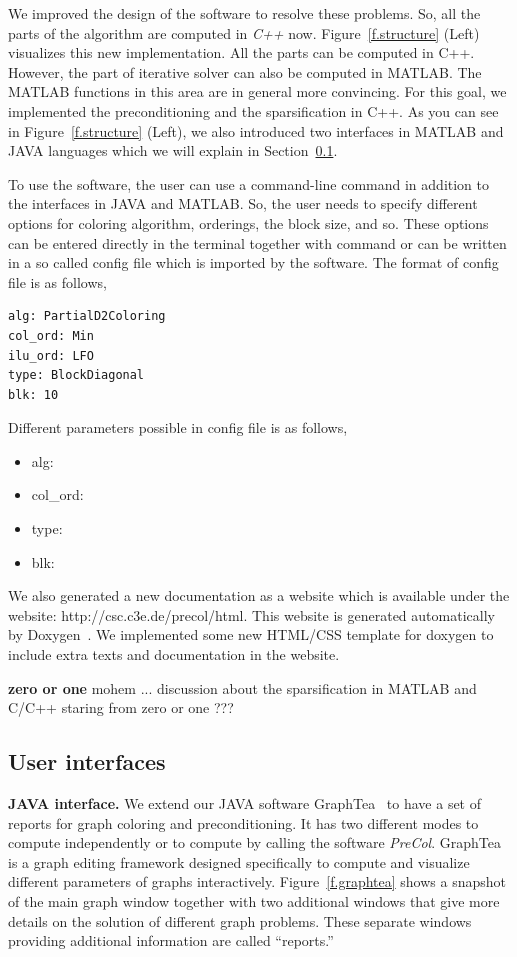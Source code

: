 \documentclass[11pt, twoside,a4paper]{book}
\newcommand{\todo}[1]{\textbf{#1}}
\begin{document}
We improved the design of the software to resolve these problems.
So, all the parts of the algorithm are computed in \textit{C++} now.
Figure~\ref{f.structure} (Left) visualizes this new implementation.
All the parts can be computed in C++. However,
the part of iterative solver can also be computed in MATLAB.
The MATLAB functions in this area are in general more convincing.
For this goal, we implemented the preconditioning and the sparsification in C++.
As you can see in Figure~\ref{f.structure} (Left), we also introduced
two interfaces in MATLAB and JAVA languages which we will explain in
Section~\ref{s.interfaces}.

To use the software, the user can use a command-line command in addition to
the interfaces in JAVA and MATLAB. So, the user needs to specify different
options for coloring algorithm, orderings, the block size, and so.
These options can be entered directly in the terminal together with command
or can be written in a so called config file which is imported by the software.
The format of config file is as follows,
\begin{lstlisting}
alg: PartialD2Coloring
col_ord: Min
ilu_ord: LFO
type: BlockDiagonal
blk: 10
\end{lstlisting}
Different parameters possible in config file is as follows,
\begin{itemize}
\item alg:
\item col\_ord:
\item type:
\item blk:
\end{itemize}

We also generated a new documentation as a website which is available
under the website: http://csc.c3e.de/precol/html.
This website is generated automatically by Doxygen~\cite{Lischner2013}.
We implemented some new HTML/CSS template for doxygen to include extra
texts and documentation in the website.

\todo{zero or one}
mohem ... discussion about the sparsification in MATLAB and C/C++
staring from zero or one ???


\subsection{User interfaces}
\label{s.interfaces}
\textbf{JAVA interface.}
We extend our JAVA software GraphTea~
\cite{2014:07,2014:15,2014:16,2015:05,2015:06,2015:07,2015:08} to have a
set of reports for graph coloring and preconditioning. It has two different modes
to compute independently or to compute by calling the software \textit{PreCol}.
GraphTea is a graph editing framework designed specifically to compute and visualize
different parameters of graphs interactively.
Figure~\ref{f.graphtea} shows a snapshot of the main
graph window together with two additional windows that give more details on the solution
of different graph problems. These separate windows providing additional information are
called ``reports.''
\end{document}
